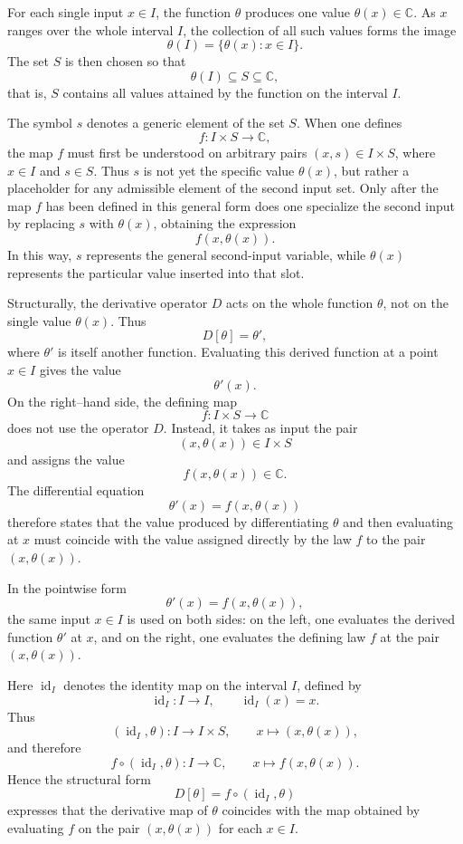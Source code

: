 \documentclass[12pt]{article}
\begin{document}
	For each single input \(x\in I\), the function \(\theta\) produces one value \(\theta(x)\in\mathbb{C}\). As \(x\) ranges over the whole interval \(I\), the collection of all such values forms the image
	$$
	\theta(I)=\{\theta(x):x\in I\}.
	$$
	The set \(S\) is then chosen so that
	$$
	\theta(I)\subseteq S\subseteq\mathbb{C},
	$$
	that is, \(S\) contains all values attained by the function on the interval \(I\).
	
	The symbol \(s\) denotes a generic element of the set \(S\). When one defines
	$$
	f:I\times S\to\mathbb{C},
	$$
	the map \(f\) must first be understood on arbitrary pairs \((x,s)\in I\times S\), where \(x\in I\) and \(s\in S\). Thus \(s\) is not yet the specific value \(\theta(x)\), but rather a placeholder for any admissible element of the second input set. Only after the map \(f\) has been defined in this general form does one specialize the second input by replacing \(s\) with \(\theta(x)\), obtaining the expression
	$$
	f(x,\theta(x)).
	$$
	In this way, \(s\) represents the general second-input variable, while \(\theta(x)\) represents the particular value inserted into that slot.
	
	Structurally, the derivative operator \(D\) acts on the whole function \(\theta\), not on the single value \(\theta(x)\). Thus
	$$
	D[\theta]=\theta',
	$$
	where \(\theta'\) is itself another function. Evaluating this derived function at a point \(x\in I\) gives the value
	$$
	\theta'(x).
	$$
	On the right--hand side, the defining map
	$$
	f:I\times S\to\mathbb{C}
	$$
	does not use the operator \(D\). Instead, it takes as input the pair
	$$
	(x,\theta(x))\in I\times S
	$$
	and assigns the value
	$$
	f(x,\theta(x))\in\mathbb{C}.
	$$
	The differential equation
	$$
	\theta'(x)=f(x,\theta(x))
	$$
	therefore states that the value produced by differentiating \(\theta\) and then evaluating at \(x\) must coincide with the value assigned directly by the law \(f\) to the pair \((x,\theta(x))\).
	
	In the pointwise form
	$$
	\theta'(x)=f(x,\theta(x)),
	$$
	the same input \(x\in I\) is used on both sides: on the left, one evaluates the derived function \(\theta'\) at \(x\), and on the right, one evaluates the defining law \(f\) at the pair \((x,\theta(x))\).
	
	Here \(\operatorname{id}_I\) denotes the identity map on the interval \(I\), defined by
	$$
	\operatorname{id}_I:I\to I,\qquad \operatorname{id}_I(x)=x.
	$$
	Thus
	$$
	(\operatorname{id}_I,\theta):I\to I\times S,\qquad x\mapsto (x,\theta(x)),
	$$
	and therefore
	$$
	f\circ(\operatorname{id}_I,\theta):I\to\mathbb{C},\qquad x\mapsto f(x,\theta(x)).
	$$
	Hence the structural form
	$$
	D[\theta]=f\circ(\operatorname{id}_I,\theta)
	$$
	expresses that the derivative map of \(\theta\) coincides with the map obtained by evaluating \(f\) on the pair \((x,\theta(x))\) for each \(x\in I\).
	
\end{document}
